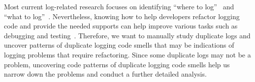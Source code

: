 Most current log-related research focuses on identifying ``where to log''~\cite{Yuan:2010:SED:1736020.1736038, Zhu:2015:LLH:2818754.2818807, kundi_icpe_2018} and ``what to log''~\cite{Yuan:2011:ISD:1950365.1950369, Shang:2014:ULL:2705615.2706065}. Nevertheless, knowing how to help developers refactor logging code and provide the needed supports can help improve various tasks such as debugging and testing~\cite{Shang:2014:ULL:2705615.2706065, Chen:2017:ALT:3103112.3103144,Lin:2016:LCB:2889160.2889232}. %
Therefore, we want to manually study duplicate logs and uncover patterns of duplicate logging code smells that may be indications of logging problems that require refactoring. Since some duplicate logs may not be a problem, uncovering code patterns of duplicate logging code smells help us narrow down the problems and conduct a further detailed analysis.





